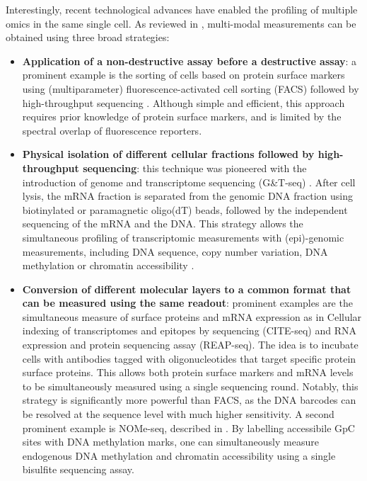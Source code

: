 Interestingly, recent technological advances have enabled the profiling of multiple omics in the same single cell. As reviewed in \cite{Stuart2019,Chappell2018}, multi-modal measurements can be obtained using three broad strategies:
\begin{itemize}
	
	\item \textbf{Application of a non-destructive assay before a destructive assay}: a prominent example is the sorting of cells based on protein surface markers using (multiparameter) fluorescence-activated cell sorting (FACS) followed by high-throughput sequencing \cite{Paul2015}. Although simple and efficient, this approach requires prior knowledge of protein surface markers, and is limited by the spectral overlap of fluorescence reporters.

	\item \textbf{Physical isolation of different cellular fractions followed by high-throughput sequencing}: this technique was pioneered with the introduction of genome and transcriptome sequencing (G\&T-seq) \cite{Macaulay2015}. After cell lysis, the mRNA fraction is separated from the genomic DNA fraction using biotinylated or paramagnetic oligo(dT) beads, followed by the independent sequencing of the mRNA and the DNA. This strategy allows the simultaneous profiling of transcriptomic measurements with (epi)-genomic measurements, including DNA sequence, copy number variation, DNA methylation or chromatin accessibility \cite{Macaulay2015,Hou2016,Angermueller2016,Hu2016}.

	\item \textbf{Conversion of different molecular layers to a common format that can be measured using the same readout}: prominent examples are the simultaneous measure of surface proteins and mRNA expression as in Cellular indexing of transcriptomes and epitopes by sequencing (CITE-seq\cite{Stoeckius2017}) and RNA expression and protein sequencing assay (REAP-seq\cite{Peterson2017}). The idea is to incubate cells with antibodies tagged with oligonucleotides that target specific protein surface proteins. This allows both protein surface markers and mRNA levels to be simultaneously measured using a single sequencing round. Notably, this strategy is significantly more powerful than FACS, as the DNA barcodes can be resolved at the sequence level with much higher sensitivity. A second prominent example is NOMe-seq, described in . By labelling accessibile GpC sites with DNA methylation marks, one can simultaneously measure endogenous DNA methylation and chromatin accessibility using a single bisulfite sequencing assay.
\end{itemize}

